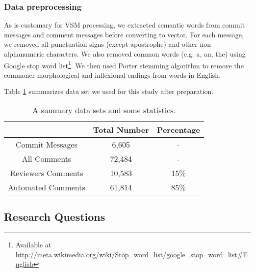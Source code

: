 %

\subsubsection{Data preprocessing}
As is customary for VSM processing, we extracted semantic words from commit messages and comment messages before converting to vector.
For each message, we removed all punctuation signs (except apostrophe) and other non alphanumeric characters. We also removed common words (e.g. a, an, the) using Google stop word list\footnote{Available at \url{http://meta.wikimedia.org/wiki/Stop_word_list/google_stop_word_list#English}}. We then used Porter stemming algorithm to remove the commoner morphological and inflexional endings from words in English.

Table \ref{tb:datastatistic} summarizes data set we used for this study after preparation. 

\begin{table}[!h]
\caption{A summary data sets and some statistics.}
\centering
\small
\begin{tabular}{ccc}
\hline
& Total Number & Percentage \\ \hline \hline
Commit Messages & 6,605 &  -  \\ \hline
All Comments & 72,484& - \\ \hline
Reviewers Comments & 10,583 & 15\% \\ \hline
Automated Comments & 61,814 & 85\% \\ \hline 

\end{tabular}
\label{tb:datastatistic}
\end{table}

\subsection{Research Questions}

